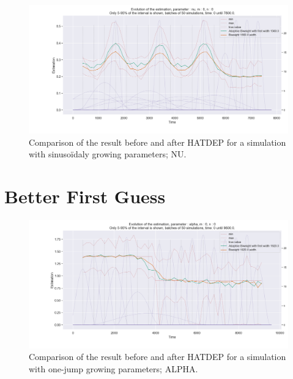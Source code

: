 \begin{figure}
\centering
\includegraphics[width = 0.90 \textwidth]{../imag/chap3/4/O.png}
\caption{Comparison of the result before and after HATDEP for a simulation with sinusoïdaly growing parameters; NU.}
\label{fig:first_estimate_4_nu}
\end{figure}



































\newpage
\section{Better First Guess}



\begin{figure}
\centering
\includegraphics[width = 0.90 \textwidth]{../imag/chap3/2_bis/P.png}
\caption{Comparison of the result before and after HATDEP for a simulation with one-jump growing parameters; ALPHA.}
\label{fig:second_estimate_2_alpha}
\end{figure}


